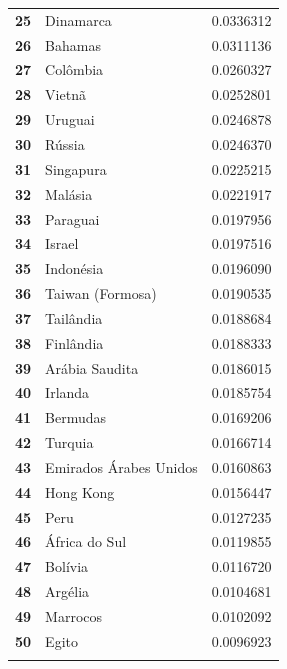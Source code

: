 \documentclass[
]{article}
\begin{document}
\begin{longtable}[t]{>{\raggedleft\arraybackslash}p{5em}lr}
\textbf{25} & Dinamarca & 0.0336312\\
\addlinespace
\textbf{26} & Bahamas & 0.0311136\\
\textbf{27} & Colômbia & 0.0260327\\
\textbf{28} & Vietnã & 0.0252801\\
\textbf{29} & Uruguai & 0.0246878\\
\textbf{30} & Rússia & 0.0246370\\
\addlinespace
\textbf{31} & Singapura & 0.0225215\\
\textbf{32} & Malásia & 0.0221917\\
\textbf{33} & Paraguai & 0.0197956\\
\textbf{34} & Israel & 0.0197516\\
\textbf{35} & Indonésia & 0.0196090\\
\addlinespace
\textbf{36} & Taiwan (Formosa) & 0.0190535\\
\textbf{37} & Tailândia & 0.0188684\\
\textbf{38} & Finlândia & 0.0188333\\
\textbf{39} & Arábia Saudita & 0.0186015\\
\textbf{40} & Irlanda & 0.0185754\\
\addlinespace
\textbf{41} & Bermudas & 0.0169206\\
\textbf{42} & Turquia & 0.0166714\\
\textbf{43} & Emirados Árabes Unidos & 0.0160863\\
\textbf{44} & Hong Kong & 0.0156447\\
\textbf{45} & Peru & 0.0127235\\
\addlinespace
\textbf{46} & África do Sul & 0.0119855\\
\textbf{47} & Bolívia & 0.0116720\\
\textbf{48} & Argélia & 0.0104681\\
\textbf{49} & Marrocos & 0.0102092\\
\textbf{50} & Egito & 0.0096923\\*
\end{longtable}
\endgroup{}
\end{document}
